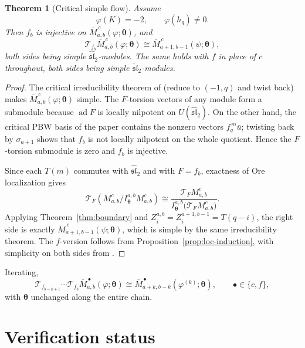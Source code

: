 \documentclass[11pt,a4paper]{article}
\newcommand{\slh}{\widehat{\mathfrak{sl}}_2}
\newcommand{\slt}{\widetilde{\mathfrak{sl}}_2}
\newcommand{\ad}{\operatorname{ad}}
\newcommand{\T}{\mathcal T}
\theoremstyle{plainupright}
\newtheorem{theorem}[proposition]{Theorem}
\begin{document}
\begin{theorem}[Critical simple flow]\label{thm:critical-flow}
Assume
\[
\varphi(K)=-2,\qquad \varphi(h_q)\ne0.
\]
Then \(f_b\) is injective on \(\overline M^{\,c}_{a,b}(\varphi;\boldsymbol\theta)\), and
\[
\boxed{\ \T_{f_b}\overline M^{\,c}_{a,b}(\varphi;\boldsymbol\theta)
\cong \overline M^{\,c}_{a+1,b-1}(\psi;\boldsymbol\theta),\ }
\]
both sides being simple \(\slh\)-modules. The same holds with \(f\) in place
of \(c\) throughout, both sides being simple \(\slt\)-modules.
\end{theorem}

\begin{proof}
The critical irreducibility theorem of \cite{FGXZ} (reduce to \((-1,q)\) and
twist back) makes \(\overline M^{\,c}_{a,b}(\varphi;\boldsymbol\theta)\)
simple. The \(F\)-torsion vectors of any module form a submodule because
\(\ad F\) is locally nilpotent on \(U(\slh)\). On the other hand, the critical
PBW basis of the paper contains the nonzero vectors \(f_q^{\,m}\bar u\);
twisting back by \(\sigma_{a+1}\) shows that \(f_b\) is not locally nilpotent
on the whole quotient. Hence the \(F\)-torsion submodule is zero and \(f_b\)
is injective.

Since each \(T(m)\) commutes with \(\slh\) and with \(F=f_b\), exactness of
Ore localization gives
\[
\T_F\!\left(M^c_{a,b}/I^{a,b}_{\boldsymbol\theta}M^c_{a,b}\right)
\cong
\frac{\T_FM^c_{a,b}}{I^{a,b}_{\boldsymbol\theta}\bigl(\T_FM^c_{a,b}\bigr)}.
\]
Applying Theorem~\ref{thm:boundary} and
\(Z_i^{a,b}=Z_i^{a+1,b-1}=T(q-i)\), the right side is exactly
\(\overline M^{\,c}_{a+1,b-1}(\psi;\boldsymbol\theta)\), which is simple by the
same irreducibility theorem. The \(f\)-version follows from
Proposition~\ref{prop:loc-induction}, with simplicity on both sides from
\cite[Theorem 4.2]{FGXZ}.
\end{proof}

Iterating,
\[
\T_{f_{b-k+1}}\cdots\T_{f_b}
\overline M^{\,\bullet}_{a,b}(\varphi;\boldsymbol\theta)
\cong
\overline M^{\,\bullet}_{a+k,b-k}(\varphi^{(k)};\boldsymbol\theta),
\qquad \bullet\in\{c,f\},
\]
with \(\boldsymbol\theta\) unchanged along the entire chain.

\section{Verification status}\label{sec:verify}
\end{document}
